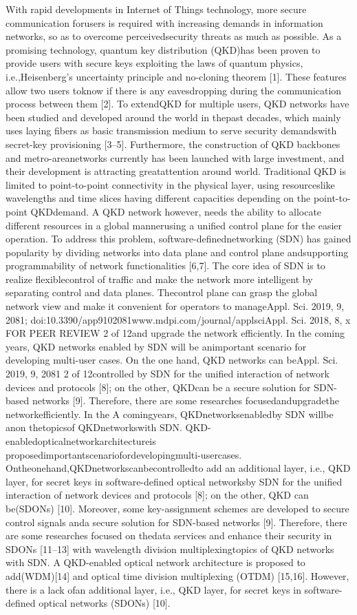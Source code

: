 With rapid developments in Internet of Things technology, more secure communication forusers is required with increasing demands in information networks, so as to overcome perceivedsecurity threats as much as possible. As a promising technology, quantum key distribution (QKD)has been proven to provide users with secure keys exploiting the laws of quantum physics, i.e.,Heisenberg’s uncertainty principle and no-cloning theorem [1]. These features allow two users toknow if there is any eavesdropping during the communication process between them [2]. To extendQKD for multiple users, QKD networks have been studied and developed around the world in thepast decades, which mainly uses laying fibers as basic transmission medium to serve security demandswith secret-key provisioning [3–5]. Furthermore, the construction of QKD backbones and metro-areanetworks currently has been launched with large investment, and their development is attracting greatattention around world.
Traditional QKD is limited to point-to-point connectivity in the physical layer, using resourceslike wavelengths and time slices having different capacities depending on the point-to-point QKDdemand. A QKD network however, needs the ability to allocate different resources in a global mannerusing a unified control plane for the easier operation. To address this problem, software-definednetworking (SDN) has gained popularity by dividing networks into data plane and control plane andsupporting programmability of network functionalities [6,7]. The core idea of SDN is to realize flexiblecontrol of traffic and make the network more intelligent by separating control and data planes. Thecontrol plane can grasp the global network view and make it convenient for operators to manageAppl. Sci. 2019, 9, 2081; doi:10.3390/app9102081www.mdpi.com/journal/applsciAppl. Sci. 2018, 8, x FOR PEER REVIEW
2 of 12and upgrade the network efficiently. In the coming years, QKD networks enabled by SDN will be animportant scenario for developing multi-user cases. On the one hand, QKD networks can beAppl. Sci. 2019, 9, 2081
2 of 12controlled by SDN for the unified interaction of network devices and protocols [8]; on the other, QKDcan be a secure solution for SDN-based networks [9]. Therefore, there are some researches focusedandupgradethe networkefficiently.
In the A comingyears, QKDnetworksenabledby SDN willbe anon thetopicsof QKDnetworkswith SDN.
QKD-enabledopticalnetworkarchitectureis proposedimportantscenariofordevelopingmulti-usercases.
Ontheonehand,QKDnetworkscanbecontrolledto add an additional layer, i.e., QKD layer, for secret keys in software-defined optical networksby SDN for the unified interaction of network devices and protocols [8]; on the other, QKD can be(SDONs) [10]. Moreover, some key-assignment schemes are developed to secure control signals anda secure solution for SDN-based networks [9]. Therefore, there are some researches focused on thedata services and enhance their security in SDONs [11–13] with wavelength division multiplexingtopics of QKD networks with SDN. A QKD-enabled optical network architecture is proposed to add(WDM)[14] and optical time division multiplexing (OTDM) [15,16]. However, there is a lack ofan additional layer, i.e., QKD layer, for secret keys in software-defined optical networks (SDONs) [10].
